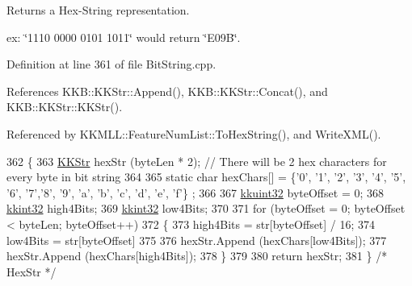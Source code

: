 Returns a Hex-\/\+String representation. 

ex\+: \char`\"{}1110 0000 0101 1011\char`\"{} would return \char`\"{}\+E09\+B\char`\"{}. 

Definition at line 361 of file Bit\+String.\+cpp.



References K\+K\+B\+::\+K\+K\+Str\+::\+Append(), K\+K\+B\+::\+K\+K\+Str\+::\+Concat(), and K\+K\+B\+::\+K\+K\+Str\+::\+K\+K\+Str().



Referenced by K\+K\+M\+L\+L\+::\+Feature\+Num\+List\+::\+To\+Hex\+String(), and Write\+X\+M\+L().


\begin{DoxyCode}
362 \{
363   \hyperlink{class_k_k_b_1_1_k_k_str}{KKStr}  hexStr (byteLen * 2);  \textcolor{comment}{// There will be 2 hex characters for every byte in bit string}
364 
365   \textcolor{keyword}{static} \textcolor{keywordtype}{char}  hexChars[] = \{\textcolor{charliteral}{'0'}, \textcolor{charliteral}{'1'}, \textcolor{charliteral}{'2'}, \textcolor{charliteral}{'3'}, \textcolor{charliteral}{'4'}, \textcolor{charliteral}{'5'}, \textcolor{charliteral}{'6'}, \textcolor{charliteral}{'7'},\textcolor{charliteral}{'8'}, \textcolor{charliteral}{'9'}, \textcolor{charliteral}{'a'}, \textcolor{charliteral}{'b'}, \textcolor{charliteral}{'c'}, \textcolor{charliteral}{'d'}, \textcolor{charliteral}{'e'}, \textcolor{charliteral}{'f'}\}
      ;
366 
367   \hyperlink{namespace_k_k_b_af8d832f05c54994a1cce25bd5743e19a}{kkuint32}  byteOffset = 0;
368   \hyperlink{namespace_k_k_b_a8fa4952cc84fda1de4bec1fbdd8d5b1b}{kkint32}   high4Bits;
369   \hyperlink{namespace_k_k_b_a8fa4952cc84fda1de4bec1fbdd8d5b1b}{kkint32}   low4Bits;
370 
371   \textcolor{keywordflow}{for}  (byteOffset = 0;  byteOffset < byteLen;  byteOffset++)
372   \{
373     high4Bits = str[byteOffset] / 16;
374     low4Bits  = str[byteOffset] %
375 
376     hexStr.Append (hexChars[low4Bits]);
377     hexStr.Append (hexChars[high4Bits]);
378   \}
379 
380   \textcolor{keywordflow}{return} hexStr;
381 \}  \textcolor{comment}{/* HexStr */}
\end{DoxyCode}
